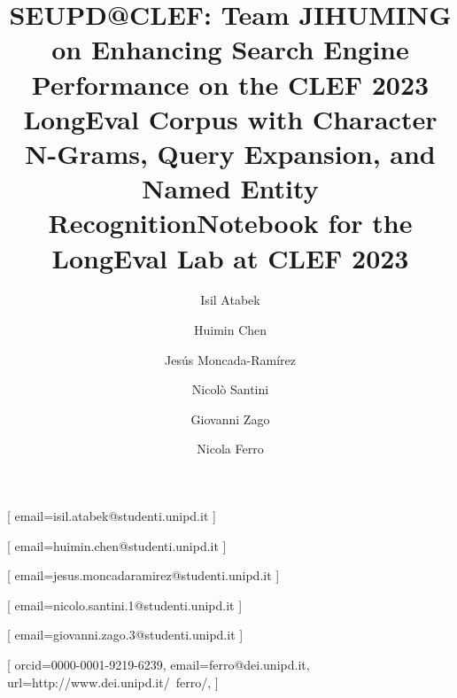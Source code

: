 \documentclass{ceurart}
\begin{document}


\title{SEUPD@CLEF: Team JIHUMING on Enhancing Search Engine Performance on the CLEF 2023 LongEval Corpus with Character N-Grams, Query Expansion, and Named Entity Recognition}

\title[mode=sub]{Notebook for the LongEval Lab at CLEF 2023}

\author[1]{Isil Atabek}[%
email=isil.atabek@studenti.unipd.it
]

\author[1]{Huimin Chen}[%
email=huimin.chen@studenti.unipd.it
]

\author[1]{Jes\'us Moncada-Ram\'irez}[%
email=jesus.moncadaramirez@studenti.unipd.it
]

\author[1]{Nicol\`o Santini}[%
email=nicolo.santini.1@studenti.unipd.it
]

\author[1]{Giovanni Zago}[%
email=giovanni.zago.3@studenti.unipd.it
]

\author[1]{Nicola Ferro}[%
orcid=0000-0001-9219-6239,
email=ferro@dei.unipd.it,
url=http://www.dei.unipd.it/~ferro/,
]

\address[1]{University of Padua, Italy}
\end{document}
